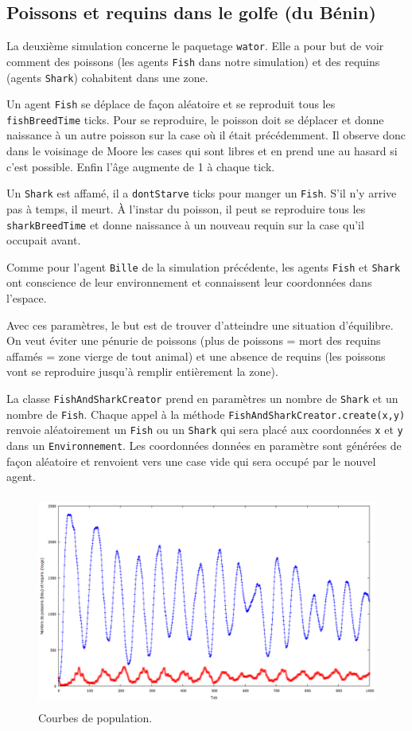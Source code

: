 \documentclass[a4paper]{article}
\begin{document}
\subsection{Poissons et requins dans le golfe (du Bénin)}
La deuxième simulation concerne le paquetage \texttt{wator}. Elle a pour but de voir comment des poissons (les agents \texttt{Fish} dans notre simulation) et des requins (agents \texttt{Shark}) cohabitent dans une zone. 

\medskip
Un agent \texttt{Fish} se déplace de façon aléatoire et se reproduit tous les \texttt{fishBreedTime} ticks. Pour se reproduire, le poisson doit se déplacer et donne naissance à un autre poisson sur la case où il était précédemment. Il observe donc dans le voisinage de Moore les cases qui sont libres et en prend une au hasard si c'est possible. Enfin l'âge augmente de 1 à chaque tick.

\medskip
Un \texttt{Shark} est affamé, il a \texttt{dontStarve} ticks pour manger un \texttt{Fish}. S'il n'y arrive pas à temps, il meurt. À l'instar du poisson, il peut se reproduire tous les \texttt{sharkBreedTime} et donne naissance à un nouveau requin sur la case qu'il occupait avant.

\medskip
Comme pour l'agent \texttt{Bille} de la simulation précédente, les agents \texttt{Fish} et \texttt{Shark} ont conscience de leur environnement et connaissent leur coordonnées dans l'espace.

\medskip
Avec ces paramètres, le but est de trouver d'atteindre une situation d'équilibre. On veut éviter une pénurie de poissons (plus de poissons = mort des requins affamés = zone vierge de tout animal) et une absence de requins (les poissons vont se reproduire jusqu'à remplir entièrement la zone).

\medskip
La classe \texttt{FishAndSharkCreator} prend en paramètres un nombre de \texttt{Shark} et un nombre de \texttt{Fish}. Chaque appel à la méthode \texttt{FishAndSharkCreator.create(x,y)} renvoie aléatoirement un \texttt{Fish} ou un \texttt{Shark} qui sera placé aux coordonnées \texttt{x} et \texttt{y} dans un \texttt{Environnement}. Les coordonnées données en paramètre sont générées de façon aléatoire et renvoient vers une case vide qui sera occupé par le nouvel agent.
 
\begin{figure}[!h]
\centering
\includegraphics[height=7cm]{1000tours.png}
\caption{Courbes de population.}
\end{figure}
\end{document}

